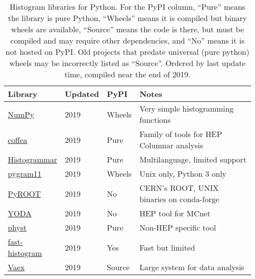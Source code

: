 \documentclass{webofc}
\begin{document}
\begin{table}[h]
	\centering
	\caption{Histogram libraries for Python. For the PyPI column, ``Pure'' means the library is pure Python, ``Wheels'' means it is compiled but binary wheels are available, ``Source'' means the code is there, but must be compiled and may require other dependencies, and ``No'' means it is not hosted on PyPI. Old projects that predate universal (pure python) wheels may be incorrectly listed as ``Source''. Ordered by last update time, compiled near the end of 2019.}
	\label{tab-libraries}       %
	\small
	\begin{tabular}{llll}
		\hline
		Library                                                                      & Updated & PyPI   & Notes                                                \\ \hline
		\href{https://www.numpy.org/}{NumPy}                                         & 2019         & Wheels & Very simple histogramming functions                  \\
		\href{https://coffeateam.github.io/coffea/notebooks/histograms.html}{coffea} & 2019         & Pure   & Family of tools for HEP Columnar analysis            \\
		\href{https://histogrammar.org}{Histogrammar}                                & 2019         & Pure   & Multilanguage, limited support                       \\
		\href{https://pygram11.readthedocs.io}{pygram11}                             & 2019         & Wheels & Unix only, Python 3 only                             \\
		\href{https://root.cern.ch/pyroot}{PyROOT}                                   & 2019         & No     & CERN's ROOT, UNIX binaries on conda-forge            \\
		\href{https://yoda.hepforge.org}{YODA}                                       & 2019         & No     & HEP tool for MCnet                                   \\
		\href{https://physt.readthedocs.io/en/latest/tutorial.html}{physt}           & 2019         & Pure   & Non-HEP specific tool                                \\
		\href{https://github.com/astrofrog/fast-histogram}{fast-histogram}           & 2019         & Yes    & Fast but limited                                     \\
		\href{https://vaex.io}{Vaex}                                                 & 2019         & Source & Large system for data analysis                       \\

\end{tabular}
\end{table}
\end{document}
